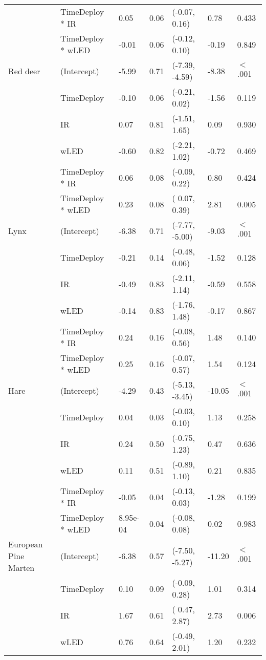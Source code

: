 \begin{tabular}{lllllll}
   & TimeDeploy * IR & 0.05 & 0.06 & (-0.07,  0.16) & 0.78 & 0.433  \\ 
   & TimeDeploy * wLED & -0.01 & 0.06 & (-0.12,  0.10) & -0.19 & 0.849  \\ 
  Red deer & (Intercept) & -5.99 & 0.71 & (-7.39, -4.59) & -8.38 & $<$ .001 \\ 
   & TimeDeploy & -0.10 & 0.06 & (-0.21,  0.02) & -1.56 & 0.119  \\ 
   & IR & 0.07 & 0.81 & (-1.51,  1.65) & 0.09 & 0.930  \\ 
   & wLED & -0.60 & 0.82 & (-2.21,  1.02) & -0.72 & 0.469  \\ 
   & TimeDeploy * IR & 0.06 & 0.08 & (-0.09,  0.22) & 0.80 & 0.424  \\ 
   & TimeDeploy * wLED & 0.23 & 0.08 & ( 0.07,  0.39) & 2.81 & 0.005  \\ 
  Lynx & (Intercept) & -6.38 & 0.71 & (-7.77, -5.00) & -9.03 & $<$ .001 \\ 
   & TimeDeploy & -0.21 & 0.14 & (-0.48,  0.06) & -1.52 & 0.128  \\ 
   & IR & -0.49 & 0.83 & (-2.11,  1.14) & -0.59 & 0.558  \\ 
   & wLED & -0.14 & 0.83 & (-1.76,  1.48) & -0.17 & 0.867  \\ 
   & TimeDeploy * IR & 0.24 & 0.16 & (-0.08,  0.56) & 1.48 & 0.140  \\ 
   & TimeDeploy * wLED & 0.25 & 0.16 & (-0.07,  0.57) & 1.54 & 0.124  \\ 
  Hare & (Intercept) & -4.29 & 0.43 & (-5.13, -3.45) & -10.05 & $<$ .001 \\ 
   & TimeDeploy & 0.04 & 0.03 & (-0.03,  0.10) & 1.13 & 0.258  \\ 
   & IR & 0.24 & 0.50 & (-0.75,  1.23) & 0.47 & 0.636  \\ 
   & wLED & 0.11 & 0.51 & (-0.89,  1.10) & 0.21 & 0.835  \\ 
   & TimeDeploy * IR & -0.05 & 0.04 & (-0.13,  0.03) & -1.28 & 0.199  \\ 
   & TimeDeploy * wLED & 8.95e-04 & 0.04 & (-0.08,  0.08) & 0.02 & 0.983  \\ 
  European Pine Marten & (Intercept) & -6.38 & 0.57 & (-7.50, -5.27) & -11.20 & $<$ .001 \\ 
   & TimeDeploy & 0.10 & 0.09 & (-0.09,  0.28) & 1.01 & 0.314  \\ 
   & IR & 1.67 & 0.61 & ( 0.47,  2.87) & 2.73 & 0.006  \\ 
   & wLED & 0.76 & 0.64 & (-0.49,  2.01) & 1.20 & 0.232  \\ 

\end{tabular}
